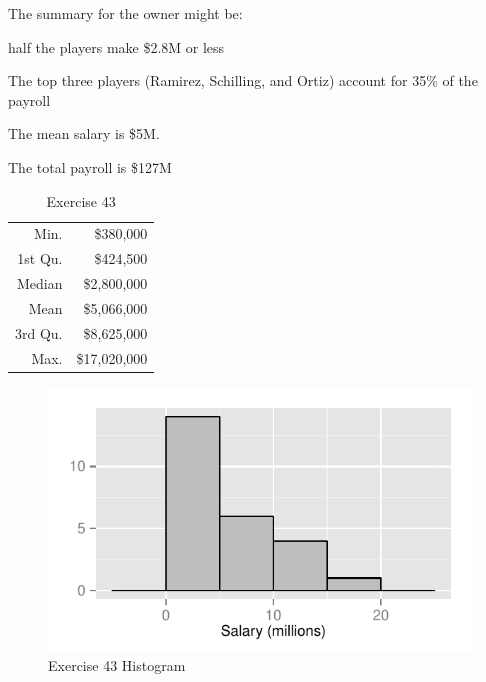\documentclass[letterpaper, landscape]{exam}
\begin{document}
\begin{description}
        The summary for the owner might be:
        \begin{itemize*}
          \item half the players make \$2.8M or less
          \item The top three players (Ramirez, Schilling, and Ortiz) account
            for 35\% of the payroll
          \item The mean salary is \$5M.
          \item The total payroll is \$127M
        \end{itemize*}

        \begin{table}[H]
          \centering
          \begin{tabular}{rr}
            \toprule
            Min.    & \$380,000 \\
            1st Qu. & \$424,500 \\
            Median  & \$2,800,000 \\
            Mean    & \$5,066,000 \\
            3rd Qu. & \$8,625,000 \\
            Max.    & \$17,020,000 \\
            \bottomrule
          \end{tabular}
          \caption{Exercise 43}
        \end{table}
        \begin{figure}[H]
          \centering
          \includegraphics{figures/ex43.pdf}
          \caption{Exercise 43 Histogram}
        \end{figure}


\end{description}
\end{document}
